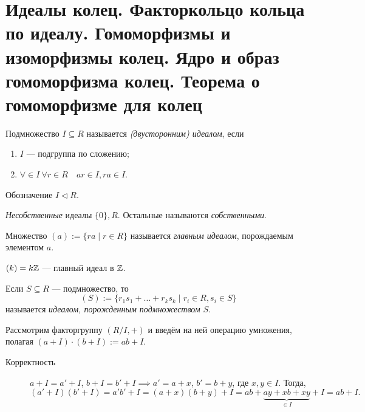\section{Идеалы колец. Факторкольцо кольца по идеалу. Гомоморфизмы и изоморфизмы колец. Ядро и образ гомоморфизма колец. Теорема о гомоморфизме для колец}

\begin{definition}
    Подмножество $I \subseteq R$ называется \textit{(двусторонним) идеалом}, если
    \begin{enumerate}
    \item $I$ --- подгруппа по сложению;
    \item $\forall \in I \ \forall r \in R \quad ar \in I, ra \in I$.
    \end{enumerate}

    Обозначение $I \lhd R$.
\end{definition}

\begin{example}
    \textit{Несобственные} идеалы $ \{0\}, R$. Остальные называются \textit{собственными}.
\end{example}

\begin{definition}
    Множество $(a) := \{ra \mid r \in R\}$ называется \textit{главным идеалом}, порождаемым элементом $a$. 
\end{definition}

\begin{example}
    $(k) = k\mathbb{Z}$ --- главный идеал в $\mathbb{Z}$.
\end{example}

\begin{comment}
    $(a) = R \iff a$ обратим

    $(a) = \{0\} \iff a = 0$.
\end{comment}


\begin{definition}
    Если $S \subseteq R$ --- подмножество, то 
    \begin{equation*}
        (S) := \{r_1 s_1 + \dots + r_k s_k \mid r_i \in R, s_i \in S\}
    \end{equation*}
    называется \textit{идеалом, порожденным подмножеством} $S$.
\end{definition}

\bigskip
Рассмотрим факторгруппу $(R/I, +)$ и введём на ней операцию умножения, полагая $(a + I) \cdot (b + I) := ab + I$.

\begin{description}
\item[Корректность] $a + I = a' + I$, $b + I = b' + I \implies a' = a + x$, $b' = b + y$, где $x, y \in I$. Тогда, 
    \begin{equation*}
        (a' + I)(b' + I) = a' b' + I = (a + x) (b + y) + I = ab + \underbrace{ay + xb + xy}_{\in I} + I = ab + I
    .\end{equation*}
\end{description}

